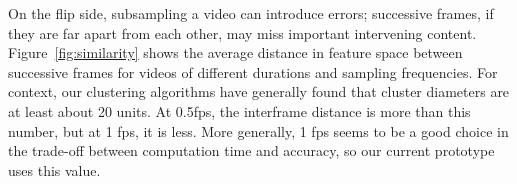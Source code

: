 
On the flip side, subsampling a video can introduce errors; successive
frames, if they are far apart from each other, may miss important
intervening content.
%
Figure~\ref{fig:similarity} shows the average distance in feature
space between successive frames for videos of different durations and
sampling frequencies.
%
For context, our clustering algorithms have generally found that
cluster diameters are at least about 20  units.
%
At 0.5fps, the interframe distance is more than this number, but at 1
fps, it is less.
%
More generally, 1 fps seems to be a good choice in the trade-off
between computation time and accuracy, so our current prototype uses
this value.
%
%


